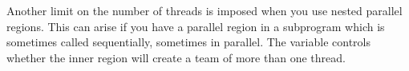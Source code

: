 Another limit on the number of threads is imposed when you use nested parallel regions.
This can arise if you have a parallel region in a subprogram which is sometimes called
sequentially, sometimes in parallel. The variable  controls
whether the inner region will create a team of more than one thread.

